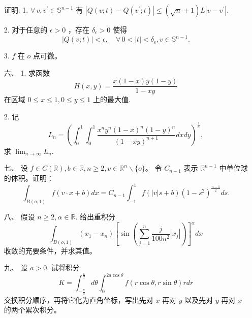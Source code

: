 \begin{enumerate}
证明: 1. $\forall\, v, v^{\prime} \in \mathbb{S}^{n-1}$ 有 
$\left|Q(v ; t)-Q(v^{\prime} ; t)\right| 
\leq(\sqrt{n}+1) L\left|v-v^{\prime}\right|$.

2. 对于任意的 $\epsilon>0$ ，存在 $\delta_{\epsilon}>0$ 使得
$$|Q(v ; t)|<\epsilon, \quad \forall\, 0<|t|<\delta_{\epsilon}, v \in \mathbb{S}^{n-1}.$$

3. $f$ 在 $o$ 点可微。

\item[六、] 1. 求函数
$$H(x, y)=\frac{x(1-x) y(1-y)}{1-x y}$$
在区域 $0 \leq x \leq 1,0 \leq y \leq 1$ 上的最大值.

2. 记
$$L_{n}=\left(\int_{0}^{1} \int_{0}^{1} \frac{x^{n} y^{n}(1-x)^{n}(1-y)^{n}}{(1-xy)^{n+1}} dx dy\right)^{\frac{1}{n}},$$
求 $\lim_{n \rightarrow \infty} L_n$.

\item[七、] 设 $f \in C(\mathbb{R}), b \in \mathbb{R}, n \geq 2, v \in \mathbb{R}^{n} \backslash\{o\}$。
令 $C_{n-1}$ 表示 $\mathbb{R}^{n-1}$ 中单位球的体积。证明：
$$\int_{B(o, 1)} f(v \cdot x+b) d x=C_{n-1} \int_{-1}^{1} f(|v| s+b)\left(1-s^{2}\right)^{\frac{n-1}{2}} ds.$$

\item[八、] 假设 $n \geq 2, \alpha \in \mathbb{R}$. 给出重积分
$$\int_{B(o, 1)}\left(x_{1}-x_{n}\right)\left[\sin \left(\sum_{j=1}^{n} \frac{j}{100 n^{2}}\left|x_{j}\right|\right)\right]^{\alpha} dx$$
收敛的充要条件，并求其值。

\item[九、] 设 $a>0$. 试将积分
$$K=\int_{-\frac{\pi}{4}}^{\frac{\pi}{2}} d \theta 
\int_{0}^{2 a \cos \theta} f(r \cos \theta, r \sin \theta) r dr$$
交换积分顺序，再将它化为直角坐标，写出先对 $x$ 再对 $y$ 以及先对 $y$ 再对 $x$ 的两个累次积分。
\end{enumerate}

